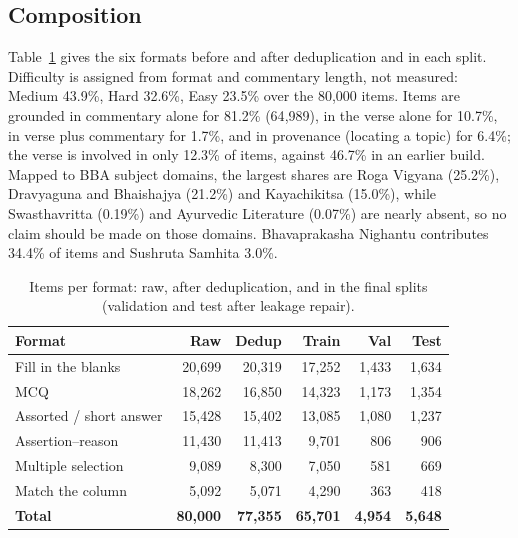 \documentclass[10pt,twocolumn,letterpaper]{article}
\begin{document}
\subsection{Composition}

Table~\ref{tab:formats} gives the six formats before and after deduplication
and in each split. Difficulty is assigned from format and commentary length,
not measured: Medium 43.9\%, Hard 32.6\%, Easy 23.5\% over the 80{,}000 items.
Items are grounded in commentary alone for 81.2\% (64{,}989), in the verse alone
for 10.7\%, in verse plus commentary for 1.7\%, and in provenance (locating a
topic) for 6.4\%; the verse is involved in only 12.3\% of items, against 46.7\%
in an earlier build. Mapped to BBA subject domains, the largest shares are
Roga Vigyana (25.2\%), Dravyaguna and Bhaishajya (21.2\%) and Kayachikitsa
(15.0\%), while Swasthavritta (0.19\%) and Ayurvedic Literature (0.07\%) are
nearly absent, so no claim should be made on those domains. Bhavaprakasha
Nighantu contributes 34.4\% of items and Sushruta Samhita 3.0\%.

\begin{table}[t]
\centering
\small
\setlength{\tabcolsep}{3pt}
\begin{tabular}{@{}lrrrrr@{}}
\toprule
\textbf{Format} & \textbf{Raw} & \textbf{Dedup} & \textbf{Train} & \textbf{Val} & \textbf{Test} \\
\midrule
Fill in the blanks       & 20{,}699 & 20{,}319 & 17{,}252 & 1{,}433 & 1{,}634 \\
MCQ                      & 18{,}262 & 16{,}850 & 14{,}323 & 1{,}173 & 1{,}354 \\
Assorted / short answer  & 15{,}428 & 15{,}402 & 13{,}085 & 1{,}080 & 1{,}237 \\
Assertion--reason        & 11{,}430 & 11{,}413 &  9{,}701 &   806   &   906   \\
Multiple selection       &  9{,}089 &  8{,}300 &  7{,}050 &   581   &   669   \\
Match the column         &  5{,}092 &  5{,}071 &  4{,}290 &   363   &   418   \\
\midrule
\textbf{Total}           & \textbf{80{,}000} & \textbf{77{,}355} & \textbf{65{,}701} & \textbf{4{,}954} & \textbf{5{,}648} \\
\bottomrule
\end{tabular}
\caption{Items per format: raw, after deduplication, and in the final splits
(validation and test after leakage repair).}
\label{tab:formats}
\end{table}
\end{document}
